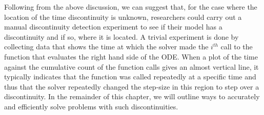 Following from the above discussion, we can suggest that, for the case where the location of the time discontinuity is unknown, researchers could carry out a manual discontinuity detection experiment to see if their model has a discontinuity and if so, where it is located. A trivial experiment is done by collecting data that shows the time at which the solver made the $i^{th}$ call to the function that evaluates the right hand side of the ODE. When a plot of the time against the cumulative count of the function calls gives an almost vertical line, it typically indicates that the function was called repeatedly at a specific time and thus that the solver repeatedly changed the step-size in this region to step over a discontinuity. In the remainder of this chapter, we will outline ways to accurately and efficiently solve problems with such discontinuities.
